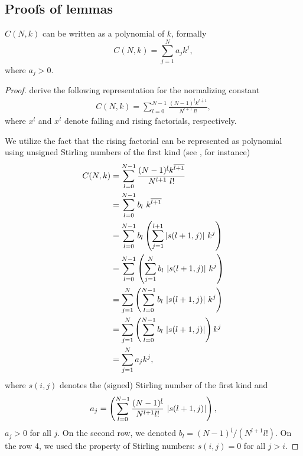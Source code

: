 \subsection{Proofs of lemmas}\label{lemmaproofs}
\setcounter{lemma}{0}
\begin{lemma} $C(N,k)$ can be written as a polynomial of $k$, formally
$$
C(N,k) = \sum_{j=1}^N a_j k^j,
$$where $a_j > 0$. 
\end{lemma}
\begin{proof} \cite{cosco.itsl08} derive the following representation for the normalizing constant
\begin{align*}  
C(N,k) = \sum_{l=0}^{N-1}\frac{(N-1)^{\underline{l}}k^{\overline{l + 1}}}{N^{l+1} \ l!} ,
\end{align*}where $x^{\underline{l}}$ and $x^{\overline{l}}$ denote falling and rising factorials, respectively. 

We utilize the fact that the rising factorial can be represented as polynomial using unsigned Stirling numbers of the first kind (see \cite{Adamchik1997}, for instance)
\begin{align*}
C(N,k) &=  \sum_{l=0}^{N-1}\frac{(N-1)^{\underline{l}}k^{\overline{l + 1}}}{N^{l+1} \ l!} \\
&= \sum_{l=0}^{N-1} b_l \ k^{\overline{l+1}} \\
&= \sum_{l=0}^{N-1} b_l \left( \sum_{j=1}^{l+1}|s(l + 1,j)| \ k^j \right) \\
&= \sum_{l=0}^{N-1} \left( \sum_{j=1}^{N}b_l \ |s(l + 1,j)| \ k^j \right) \\
&= \sum_{j=1}^{N} \left( \sum_{l=0}^{N-1} b_l \ |s(l + 1,j)| \ k^j \right) \\
&= \sum_{j=1}^{N} \left( \sum_{l=0}^{N-1} b_l \ |s(l + 1,j)| \right) k^j \\
&= \sum_{j=1}^{N} a_j  k^j,
\end{align*}where $s(i,j)$ denotes the (signed) Stirling number of the first kind and
$$
a_j = \left( \sum_{l=0}^{N-1} \frac{(N-1)^{\underline{l}}}{N^{l+1}l!} \ |s(l + 1,j)| \right),
$$ $a_j > 0$ for all $j$. On the second row, we denoted $b_l = (N-1)^{\underline{l}}/(N^{l+1} l!)$. On the row 4, we used the property of Stirling numbers: $s(i,j) = 0$ for all $j > i$. 
\end{proof}

